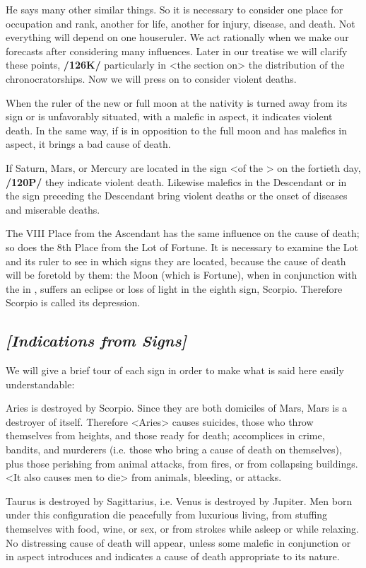 He says many other similar things. So it is necessary to consider one place for occupation and rank, another for life, another for injury, disease, and death. Not everything will depend on one houseruler. We act rationally when we make our forecasts after considering many influences. Later in our treatise we will clarify these points, \textbf{/126K/} particularly in <the section on> the distribution of the chronocratorships. Now we will press on to consider violent deaths. 

When the ruler of the new or full moon at the nativity is turned away from its sign or is unfavorably situated, with a malefic in aspect, it indicates violent death. In the same way, if \Mercury\xspace is in opposition to the full moon and has malefics in aspect, it brings a bad cause of death. 

If Saturn, Mars, or Mercury are located in the sign <of the \Moon> on the fortieth day, \textbf{/120P/} they indicate violent death. Likewise malefics in the Descendant or
in the sign preceding the Descendant bring violent deaths or the onset of diseases and miserable deaths.

The VIII Place from the Ascendant has the same influence on the cause of death; so does the 8th Place from the Lot of Fortune. It is necessary to examine the Lot and its ruler to see in which signs they are located, because the cause of death will be foretold by them: the Moon (which is Fortune), when in conjunction with the \Sun\xspace in \Aries, suffers an eclipse or loss of light in the eighth sign, Scorpio. Therefore Scorpio is called its depression.

\subsection{\textit{[Indications from Signs]}}
We will give a brief tour of each sign in order to make what is said here easily understandable:

Aries \mn{\Aries} is destroyed by Scorpio. Since they are both domiciles of Mars, Mars is a destroyer of itself. Therefore <Aries> causes suicides, those who throw themselves from heights, and those ready for death;
accomplices in crime, bandits, and murderers (i.e. those who bring a cause of death on themselves), plus those perishing from animal attacks, from fires, or from collapsing buildings. <It also causes men to die> from animals, bleeding, or attacks.

Taurus \mn{\Taurus} is destroyed by Sagittarius, i.e. Venus is destroyed by Jupiter. Men born under this configuration die peacefully from luxurious living, from stuffing themselves with food, wine, or sex, or from strokes
while asleep or while relaxing. No distressing cause of death will appear, unless some malefic in conjunction or in aspect introduces and indicates a cause of death appropriate to its nature.


